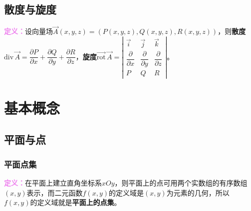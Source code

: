 \documentclass[UTF8, 12pt]{ctexart}
\begin{document}
        \subsection{散度与旋度}

        \textcolor{violet}{\textbf{定义：}}设向量场$\vec{A}(x,y,z)=(P(x,y,z),Q(x,y,z),R(x,y,z))$，则\textbf{散度}$\textrm{div}\,\vec{A}=\dfrac{\partial P}{\partial x}+\dfrac{\partial Q}{\partial y}+\dfrac{\partial R}{\partial z}$，\textbf{旋度}$\overrightarrow{\textrm{rot}}\,\vec{A}=\left\vert\begin{array}{ccc}
                                                                                                                                                                                                                                                                                                       \vec{i} & \vec{j} & \vec{k} \\
                                                                                                                                                                                                                                                                                                       \dfrac{\partial}{\partial x} & \dfrac{\partial}{\partial y} & \dfrac{\partial}{\partial z} \\
                                                                                                                                                                                                                                                                                                       P & Q & R
        \end{array}\right\vert$。

        \section{基本概念}
        \subsection{平面与点}
        \subsubsection{平面点集}

        \textcolor{violet}{\textbf{定义：}}在平面上建立直角坐标系$xOy$，则平面上的点可用两个实数组的有序数组$(x,y)$表示，而二元函数$f(x,y)$的定义域是$(x,y)$为元素的几何，所以$f(x,y)$的定义域就是\textbf{平面上的点集}。
\end{document}
